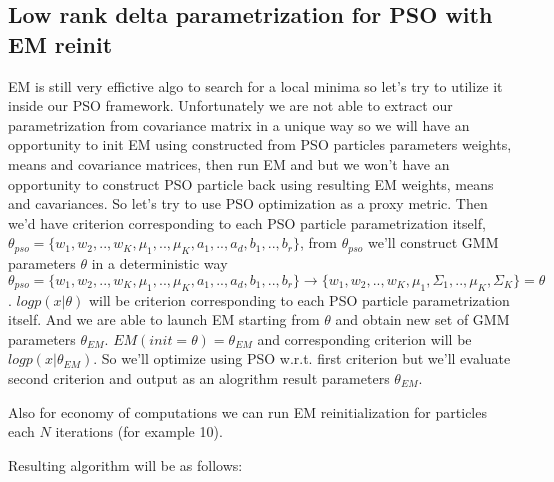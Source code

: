 \documentclass[a4paper]{article}
\begin{document}
\subsection{Low rank delta parametrization for PSO with EM reinit}

    EM is still very effictive algo to search for a local minima so let's try to utilize it inside our PSO framework. 
Unfortunately we are not able to extract our parametrization from covariance matrix in a unique way so we will have an 
opportunity to init EM using constructed from PSO particles parameters weights, means and covariance matrices, then run EM 
and but we won't have an opportunity to construct PSO particle back using resulting EM weights, means and cavariances. So let's try to use PSO optimization as a proxy metric.
Then we'd have criterion corresponding to each PSO particle parametrization itself,
$\theta_{pso} = \{w_1, w_2, .., w_K, \mu_1, .., \mu_K, a_1, .., a_d, b_1, .., b_r\}$, from $\theta_{pso}$  we'll construct GMM parameters $\theta$ in a deterministic way
$\theta_{pso} = \{w_1, w_2, .., w_K, \mu_1, .., \mu_K, a_1, .., a_d, b_1, .., b_r\} \rightarrow \{w_1, w_2, .., w_K, \mu_1, \Sigma_1, .., \mu_K, \Sigma_K\} = \theta$. 
$log p(x | \theta)$ will be criterion corresponding to each PSO particle parametrization itself. And we are able to launch EM starting from 
$\theta$ and obtain new set of GMM parameters $\theta_{EM}$. $EM(init=\theta) = \theta_{EM}$ and corresponding criterion will be $logp(x |\theta_{EM})$.
So we'll optimize using PSO w.r.t. first criterion but we'll evaluate second criterion and output as an alogrithm result parameters $\theta_{EM}$.

Also for economy of computations we can run EM reinitialization for particles each $N$ iterations (for example 10).

Resulting algorithm will be as follows:
\end{document}
